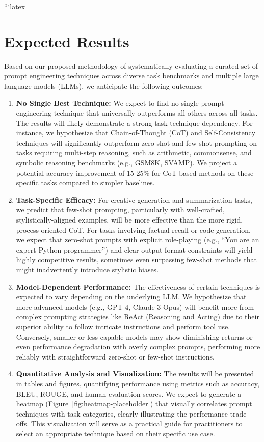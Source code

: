 \documentclass{article}
\begin{document}
```latex
\section{Expected Results}

Based on our proposed methodology of systematically evaluating a curated set of prompt engineering techniques across diverse task benchmarks and multiple large language models (LLMs), we anticipate the following outcomes:

\begin{enumerate}
    \item \textbf{No Single Best Technique:} We expect to find no single prompt engineering technique that universally outperforms all others across all tasks. The results will likely demonstrate a strong task-technique dependency. For instance, we hypothesize that Chain-of-Thought (CoT) and Self-Consistency techniques will significantly outperform zero-shot and few-shot prompting on tasks requiring multi-step reasoning, such as arithmetic, commonsense, and symbolic reasoning benchmarks (e.g., GSM8K, SVAMP). We project a potential accuracy improvement of 15-25\% for CoT-based methods on these specific tasks compared to simpler baselines.

    \item \textbf{Task-Specific Efficacy:} For creative generation and summarization tasks, we predict that few-shot prompting, particularly with well-crafted, stylistically-aligned examples, will be more effective than the more rigid, process-oriented CoT. For tasks involving factual recall or code generation, we expect that zero-shot prompts with explicit role-playing (e.g., ``You are an expert Python programmer'') and clear output format constraints will yield highly competitive results, sometimes even surpassing few-shot methods that might inadvertently introduce stylistic biases.

    \item \textbf{Model-Dependent Performance:} The effectiveness of certain techniques is expected to vary depending on the underlying LLM. We hypothesize that more advanced models (e.g., GPT-4, Claude 3 Opus) will benefit more from complex prompting strategies like ReAct (Reasoning and Acting) due to their superior ability to follow intricate instructions and perform tool use. Conversely, smaller or less capable models may show diminishing returns or even performance degradation with overly complex prompts, performing more reliably with straightforward zero-shot or few-shot instructions.

    \item \textbf{Quantitative Analysis and Visualization:} The results will be presented in tables and figures, quantifying performance using metrics such as accuracy, BLEU, ROUGE, and human evaluation scores. We expect to generate a heatmap (Figure~\ref{fig:heatmap-placeholder}) that visually correlates prompt techniques with task categories, clearly illustrating the performance trade-offs. This visualization will serve as a practical guide for practitioners to select an appropriate technique based on their specific use case.
\end{enumerate}
\end{document}
